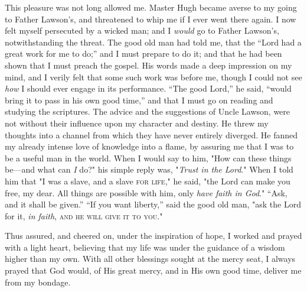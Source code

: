 This pleasure was not long allowed me. Master Hugh became averse to my
going to Father Lawson's, and threatened to whip me if I ever went there
again. I now felt myself persecuted by a wicked man; and I \emph{would}
go to Father Lawson's, notwithstanding the threat. The good old man had
told me, that the ``Lord had a great work for me to do;'' and I must
prepare to do it; and that he had been shown that I must preach the
gospel. His words made a deep impression on my mind, and I verily felt
that some such {\protect\hypertarget{169}{}{}}work was before me, though
I could not see \emph{how} I should ever engage in its performance.
``The good Lord,'' he said, ``would bring it to pass in his own good
time,'' and that I must go on reading and studying the scriptures. The
advice and the suggestions of Uncle Lawson, were not without their
influence upon my character and destiny. He threw my thoughts into a
channel from which they have never entirely diverged. He fanned my
already intense love of knowledge into a flame, by assuring me that I
was to be a useful man in the world. When I would say to him, "How can
these things be---and what can \emph{I} do?" his simple reply was,
"\emph{Trust in the Lord}." When I told him that "I was a slave, and a
slave \textsc{for life}," he said, "the Lord can make you free, my dear.
All things are possible with him, only \emph{have faith in God}." ``Ask,
and it shall be given.'' ``If you want liberty,'' said the good old man,
"ask the Lord for it, \emph{in faith}, \textsc{and he will give it to
you}."

Thus assured, and cheered on, under the inspiration of hope, I worked
and prayed with a light heart, believing that my life was under the
guidance of a wisdom higher than my own. With all other blessings sought
at the mercy seat, I always prayed that God would, of His great mercy,
and in His own good time, deliver me from my bondage.

